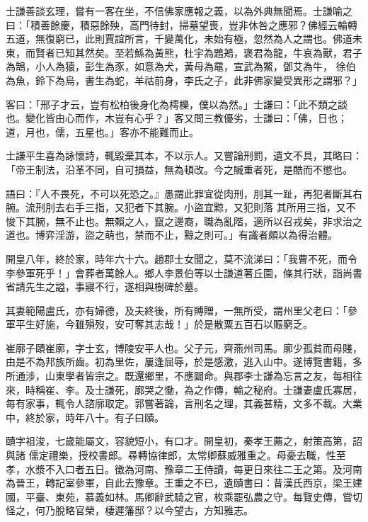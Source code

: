 \begin{pinyinscope}
 士謙善談玄理，嘗有一客在坐，不信佛家應報之義，以為外典無聞焉。士謙喻之曰：「積善餘慶，積惡餘殃，高門待封，掃墓望喪，豈非休咎之應邪？佛經云輪轉五道，無復窮已，此則賈誼所言，千變萬化，未始有極，忽然為人之謂也。佛道未東，而賢者已知其然矣。至若鯀為黃熊，杜宇為鶗鴂，褒君為龍，牛哀為獸，君子為鵠，小人為猿，彭生為豕，如意為犬，黃母為黿，宣武為鱉，鄧艾為牛，
 徐伯為魚，鈴下為烏，書生為蛇，羊祜前身，李氏之子，此非佛家變受異形之謂邪？」



 客曰：「邢子才云，豈有松柏後身化為樗櫟，僕以為然。」士謙曰：「此不類之談也。變化皆由心而作，木豈有心乎？」客又問三教優劣，士謙曰：「佛，日也；道，月也，儒，五星也。」客亦不能難而止。



 士謙平生喜為詠懷詩，輒毀棄其本，不以示人。又嘗論刑罰，遺文不具，其略曰：「帝王制法，沿革不同，自可損益，無為頓改。今之贓重者死，是酷而不懲也。



 語曰：『人不畏死，不可以死恐之。』愚謂此罪宜從肉刑，刖其一趾，再犯者斷其右腕。流刑刖去右手三指，又犯者下其腕。小盜宜黥，又犯則落
 其所用三指，又不悛下其腕，無不止也。無賴之人，竄之邊裔，職為亂階，適所以召戎矣，非求治之道也。博弈淫游，盜之萌也，禁而不止，黥之則可。」有識者頗以為得治體。



 開皇八年，終於家，時年六十六。趙郡士女聞之，莫不流涕曰：「我曹不死，而令李參軍死乎！」會葬者萬餘人。鄉人李景伯等以士謙道著丘園，條其行狀，詣尚書省請先生之謚，事寢不行，遂相與樹碑於墓。



 其妻範陽盧氏，亦有婦德，及夫終後，所有賻贈，一無所受，謂州里父老曰：「參軍平生好施，今雖殞歿，安可奪其志哉！」於是散粟五百石以賑窮乏。



 崔廓子賾崔廓，字士玄，博陵安平人也。父子元，齊燕州司馬。廓少孤貧而母賤，由是不為邦族所齒。初為里佐，屢逢屈辱，於是感激，逃入山中。遂博覽書籍，多所通涉，山東學者皆宗之。既還鄉里，不應闢命。與郡李士謙為忘言之友，每相往來，時稱崔、李。及士謙死，廓哭之慟，為之作傳，輸之秘府。士謙妻盧氏寡居，每有家事，輒令人諮廓取定。郭嘗著論，言刑名之理，其義甚精，文多不載。大業中，終於家，時年八十。有子曰賾。



 賾字祖浚，七歲能屬文，容貌短小，有口才。開皇初，秦孝王薦之，射策高第，詔與諸
 儒定禮樂，授校書郎。尋轉協律郎，太常卿蘇威雅重之。母憂去職，性至孝，水漿不入口者五日。徵為河南、豫章二王侍讀，每更日來往二王之第。及河南為晉王，轉記室參軍，自此去豫章。王重之不已，遺賾書曰：昔漢氏西京，梁王建國，平臺、東苑，慕義如林。馬卿辭武騎之官，枚乘罷弘農之守。每覽史傳，嘗切怪之，何乃脫略官榮，棲遲籓邸？以今望古，方知雅志。




\end{pinyinscope}
